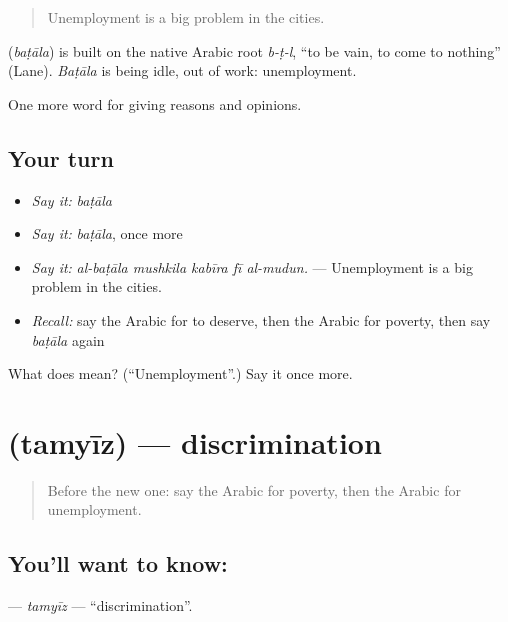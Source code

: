 \begin{quote}
Unemployment is a big problem in the cities.
\end{quote}

\begin{cousinweb}
\textbf{} (\emph{baṭāla}) is built on the native Arabic root \emph{b-ṭ-l}, \textquotedblleft{}to be vain, to come to nothing\textquotedblright{} (Lane). \emph{Baṭāla} is being idle, out of work: unemployment.
\end{cousinweb}

\begin{grammarlens}[title={What you've built}]
One more word for giving reasons and opinions.
\end{grammarlens}

\subsection*{Your turn}
\begin{itemize}
\raggedright
  \item \emph{Say it:} \emph{baṭāla}
  \item \emph{Say it:} \emph{baṭāla}, once more
  \item \emph{Say it:} \emph{al-baṭāla mushkila kabīra fī al-mudun.} — Unemployment is a big problem in the cities.
  \item \emph{Recall:} say the Arabic for to deserve, then the Arabic for poverty, then say \emph{baṭāla} again
\end{itemize}

\begin{tcolorbox}[breakable,colback=teal!4,colframe=teal!35!black,title={Before you move on}]
What does  mean? (\textquotedblleft{}Unemployment\textquotedblright{}.) Say it once more.
\end{tcolorbox}
\section[\texorpdfstring{\ar{تمييز} (tamyīz)}{تمييز (tamyīz)}]{ (tamyīz) — discrimination}

\label{lesson:AR-C381-tamyiz}



\begin{quote}
Before the new one: say the Arabic for poverty, then the Arabic for unemployment.
\end{quote}

\subsection*{You'll want to know: }
\textbf{} — \emph{tamyīz} — \textquotedblleft{}discrimination\textquotedblright{}.

